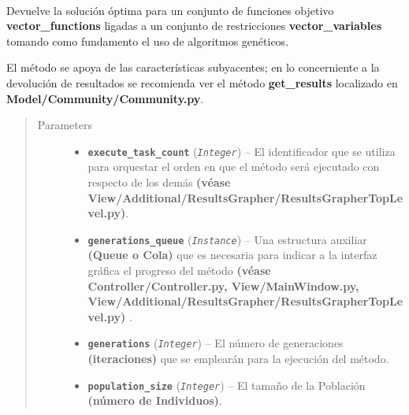 \documentclass[letterpaper,10pt,english]{sphinxmanual}
\begin{document}
\begin{fulllineitems}
~
\begin{DUlineblock}{0em}
\item[] Devuelve la solución óptima para un conjunto de funciones objetivo \textbf{vector\_functions} ligadas
a un conjunto de restricciones \textbf{vector\_variables} tomando como fundamento el uso de algoritmos genéticos.
\item[] El método se apoya de las características subyacentes; en lo concerniente a la devolución de resultados
se recomienda ver el método \textbf{get\_results} localizado en \textbf{Model/Community/Community.py}.
\end{DUlineblock}
\begin{quote}\begin{description}
\item[{Parameters}] \leavevmode\begin{itemize}
\item {} 
\textbf{\texttt{execute\_task\_count}} (\emph{\texttt{Integer}}) -- El identificador que se utiliza para orquestar el orden en que el método será ejecutado
con respecto de los demás \textbf{(véase View/Additional/ResultsGrapher/ResultsGrapherTopLevel.py)}.

\item {} 
\textbf{\texttt{generations\_queue}} (\emph{\texttt{Instance}}) -- Una estructura auxiliar \textbf{(Queue o Cola)} que es necesaria para indicar a la interfaz gráfica el progreso del método
\textbf{(véase Controller/Controller.py, View/MainWindow.py, View/Additional/ResultsGrapher/ResultsGrapherTopLevel.py)} .

\item {} 
\textbf{\texttt{generations}} (\emph{\texttt{Integer}}) -- El número de generaciones \textbf{(iteraciones)} que se emplearán para la ejecución del método.

\item {} 
\textbf{\texttt{population\_size}} (\emph{\texttt{Integer}}) -- El tamaño de la Población \textbf{(número de Individuos)}.


\end{itemize}
\end{description}
\end{quote}
\end{fulllineitems}
\end{document}
